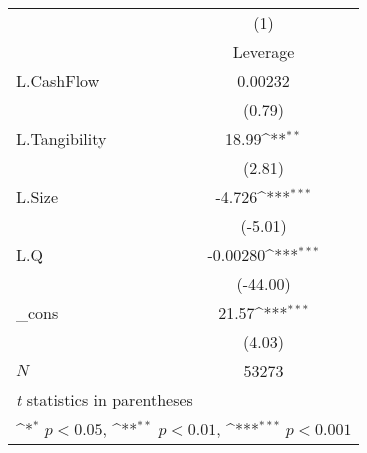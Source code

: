 {
\def\sym#1{\ifmmode^{#1}\else\(^{#1}\)\fi}
\begin{tabular}{l*{1}{c}}
\hline\hline
            &\multicolumn{1}{c}{(1)}\\
            &\multicolumn{1}{c}{Leverage}\\
\hline
L.CashFlow  &     0.00232         \\
            &      (0.79)         \\
[1em]
L.Tangibility&       18.99\sym{**} \\
            &      (2.81)         \\
[1em]
L.Size      &      -4.726\sym{***}\\
            &     (-5.01)         \\
[1em]
L.Q         &    -0.00280\sym{***}\\
            &    (-44.00)         \\
[1em]
\_cons      &       21.57\sym{***}\\
            &      (4.03)         \\
\hline
\(N\)       &       53273         \\
\hline\hline
\multicolumn{2}{l}{\footnotesize \textit{t} statistics in parentheses}\\
\multicolumn{2}{l}{\footnotesize \sym{*} \(p<0.05\), \sym{**} \(p<0.01\), \sym{***} \(p<0.001\)}\\
\end{tabular}
}
